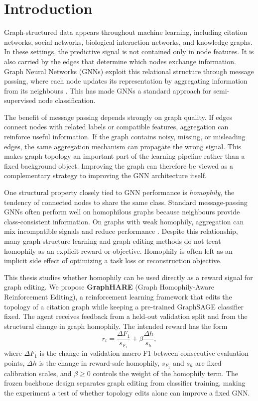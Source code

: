 \chapter{Introduction}

Graph-structured data appears throughout machine learning, including citation networks,
social networks, biological interaction networks, and knowledge graphs. In these settings,
the predictive signal is not contained only in node features. It is also carried by the
edges that determine which nodes exchange information. Graph Neural Networks (GNNs) exploit
this relational structure through message passing, where each node updates its representation
by aggregating information from its neighbours \cite{kipf2017gcn, hamilton2017graphsage}.
This has made GNNs a standard approach for semi-supervised node classification.

The benefit of message passing depends strongly on graph quality. If edges connect nodes
with related labels or compatible features, aggregation can reinforce useful information.
If the graph contains noisy, missing, or misleading edges, the same aggregation mechanism can
propagate the wrong signal. This makes graph topology an important part of the learning
pipeline rather than a fixed background object. Improving the graph can therefore be viewed
as a complementary strategy to improving the GNN architecture itself.

One structural property closely tied to GNN performance is \textit{homophily}, the tendency
of connected nodes to share the same class. Standard message-passing GNNs often perform well
on homophilous graphs because neighbours provide class-consistent information. On graphs
with weak homophily, aggregation can mix incompatible signals and reduce performance
\cite{zhu2020homophily}. Despite this relationship, many graph structure learning and graph
editing methods do not treat homophily as an explicit reward or objective. Homophily is often
left as an implicit side effect of optimizing a task loss or reconstruction objective.

This thesis studies whether homophily can be used directly as a reward signal for graph
editing. We propose \textbf{GraphHARE} (Graph Homophily-Aware Reinforcement Editing), a
reinforcement learning framework that edits the topology of a citation graph while keeping a
pre-trained GraphSAGE classifier fixed. The agent receives feedback from a held-out validation
split and from the structural change in graph homophily. The intended reward has the form
\begin{equation}
    r_t =
    \frac{\Delta F_1}{s_{F_1}}
    + \beta \frac{\Delta h}{s_h},
    \label{eq:reward}
\end{equation}
where $\Delta F_1$ is the change in validation macro-F1 between consecutive evaluation
points, $\Delta h$ is the change in reward-safe homophily, $s_{F_1}$ and $s_h$ are fixed
calibration scales, and $\beta \geq 0$ controls the weight of the homophily term. The frozen
backbone design separates graph editing from classifier training, making the experiment a
test of whether topology edits alone can improve a fixed GNN.

